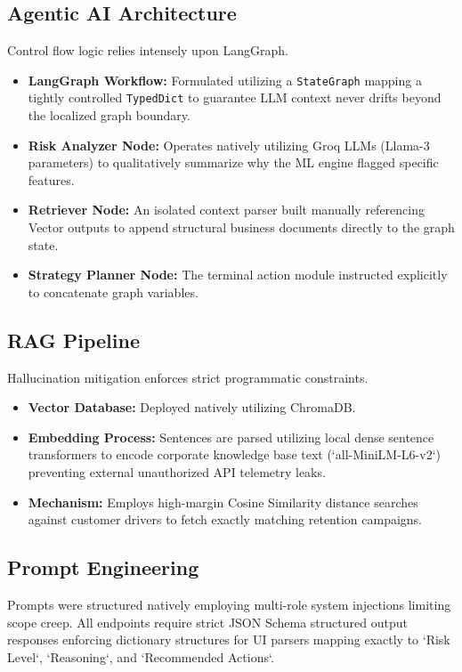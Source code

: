 \documentclass[conference, a4paper]{IEEEtran}
\begin{document}
\subsection{Agentic AI Architecture}
Control flow logic relies intensely upon LangGraph. 
\begin{itemize}
    \item \textbf{LangGraph Workflow:} Formulated utilizing a \texttt{StateGraph} mapping a tightly controlled \texttt{TypedDict} to guarantee LLM context never drifts beyond the localized graph boundary. 
    \item \textbf{Risk Analyzer Node:} Operates natively utilizing Groq LLMs (Llama-3 parameters) to qualitatively summarize why the ML engine flagged specific features.
    \item \textbf{Retriever Node:} An isolated context parser built manually referencing Vector outputs to append structural business documents directly to the graph state.
    \item \textbf{Strategy Planner Node:} The terminal action module instructed explicitly to concatenate graph variables.
\end{itemize}

\subsection{RAG Pipeline}
Hallucination mitigation enforces strict programmatic constraints.
\begin{itemize}
    \item \textbf{Vector Database:} Deployed natively utilizing ChromaDB.
    \item \textbf{Embedding Process:} Sentences are parsed utilizing local dense sentence transformers to encode corporate knowledge base text (`all-MiniLM-L6-v2`) preventing external unauthorized API telemetry leaks.
    \item \textbf{Mechanism:} Employs high-margin Cosine Similarity distance searches against customer drivers to fetch exactly matching retention campaigns.
\end{itemize}

\subsection{Prompt Engineering}
Prompts were structured natively employing multi-role system injections limiting scope creep. All endpoints require strict JSON Schema structured output responses enforcing dictionary structures for UI parsers mapping exactly to `Risk Level`, `Reasoning`, and `Recommended Actions`.
\end{document}
